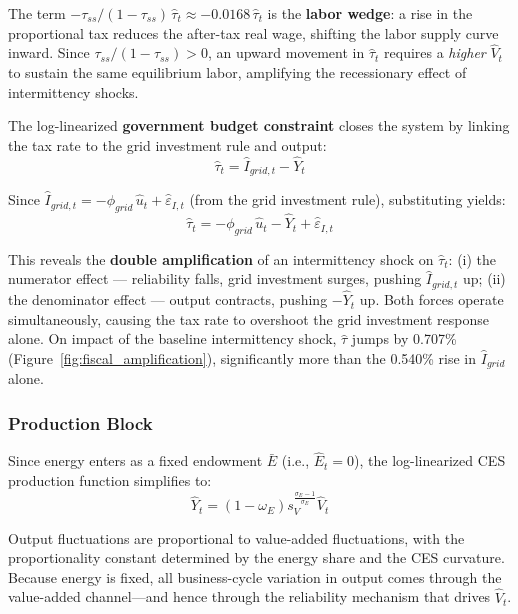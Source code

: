 \documentclass[12pt, a4paper]{article}
\begin{document}
The term $-\tau_{ss}/(1-\tau_{ss})\,\hat{\tau}_t \approx -0.0168\,\hat{\tau}_t$ is the \textbf{labor wedge}: a rise in the proportional tax reduces the after-tax real wage, shifting the labor supply curve inward. Since $\tau_{ss}/(1-\tau_{ss}) > 0$, an upward movement in $\hat{\tau}_t$ requires a \textit{higher} $\hat{V}_t$ to sustain the same equilibrium labor, amplifying the recessionary effect of intermittency shocks.

The log-linearized \textbf{government budget constraint} closes the system by linking the tax rate to the grid investment rule and output:
\begin{equation}
\hat{\tau}_t = \hat{I}_{grid,t} - \hat{Y}_t
\label{eq:tau_lin}
\end{equation}

Since $\hat{I}_{grid,t} = -\phi_{grid}\,\hat{u}_t + \hat{\varepsilon}_{I,t}$ (from the grid investment rule), substituting yields:
\begin{equation}
\hat{\tau}_t = -\phi_{grid}\,\hat{u}_t - \hat{Y}_t + \hat{\varepsilon}_{I,t}
\label{eq:tau_expanded_lin}
\end{equation}

This reveals the \textbf{double amplification} of an intermittency shock on $\hat{\tau}_t$: (i) the numerator effect --- reliability falls, grid investment surges, pushing $\hat{I}_{grid,t}$ up; (ii) the denominator effect --- output contracts, pushing $-\hat{Y}_t$ up. Both forces operate simultaneously, causing the tax rate to overshoot the grid investment response alone. On impact of the baseline intermittency shock, $\hat{\tau}$ jumps by 0.707\% (Figure~\ref{fig:fiscal_amplification}), significantly more than the 0.540\% rise in $\hat{I}_{grid}$ alone.

\subsubsection{Production Block}

Since energy enters as a fixed endowment $\bar{E}$ (i.e., $\hat{E}_t = 0$), the log-linearized CES production function simplifies to:
\begin{equation}
\hat{Y}_t = (1-\omega_E) s_V^{\frac{\sigma_E - 1}{\sigma_E}} \hat{V}_t
\label{eq:output_lin}
\end{equation}

Output fluctuations are proportional to value-added fluctuations, with the proportionality constant determined by the energy share and the CES curvature. Because energy is fixed, all business-cycle variation in output comes through the value-added channel---and hence through the reliability mechanism that drives $\hat{V}_t$.
\end{document}
